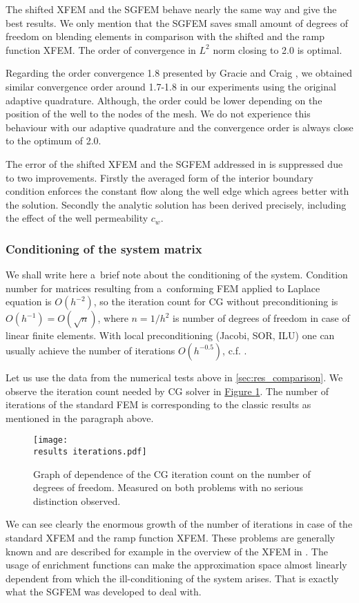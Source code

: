 \documentclass[dvipsnames,FM,Dis]{tulthesis}
\newcommand{\fig}[1]{\hyperref[#1]{Figure \ref{#1}}}
\newcommand{\results}{results/}
\begin{document}
The shifted XFEM and the SGFEM behave nearly the same way and give the best results. We only mention that the SGFEM saves 
small amount of degrees of freedom on blending elements in comparison with the shifted and the ramp function XFEM.
The order of convergence in $L^2$ norm closing to 2.0 is optimal.

Regarding the order convergence 1.8 presented by Gracie and Craig \cite{gracie_modelling_2010}, we obtained similar convergence order 
around 1.7-1.8 in our experiments using the original adaptive quadrature. Although, the order could be lower 
depending on the position of the well to the nodes of the mesh. We do not experience this behaviour with our adaptive
quadrature and the convergence order is always close to the optimum of 2.0.

The error of the shifted XFEM and the SGFEM addressed in \cite{exner_2016} is suppressed due to two improvements. 
Firstly the averaged form of the interior boundary condition enforces the constant flow along the well edge
which agrees better with the solution.
Secondly the analytic solution has been derived precisely, including the effect of the well permeability $c_w$.



\subsubsection{Conditioning of the system matrix} \label{sec:res_conditioning}
We shall write here a~brief note about the conditioning of the system.
Condition number for matrices resulting from a~conforming FEM applied to Laplace equation is $O(h^{-2})$, so the iteration count 
for CG without preconditioning is $O(h^{-1})=O(\sqrt{n})$, where $n=1/h^2$ is number of degrees of freedom in case of linear finite elements. 
With local preconditioning (Jacobi, 
SOR, ILU) one can usually achieve the number of iterations $O(h^{-0.5})$, c.f. \cite{ern_evaluation_2006}.

Let us use the data from the numerical tests above in \ref{sec:res_comparison}.
We observe the iteration count needed by CG solver in \fig{fig:iterations}.
The number of iterations of the standard FEM is corresponding to the classic results as mentioned in the paragraph above. 

\begin{figure}[!htb]
  \centering    
  \texttt{[image: \\results iterations.pdf]}
  \caption[Iterations graph]{Graph of dependence of the CG iteration count on the 
  number of degrees of freedom. Measured on both problems with no serious distinction observed.}
  \label{fig:iterations}
\end{figure}
%
We can see clearly the enormous growth of the number of iterations in case of the standard XFEM and the ramp 
function XFEM. These problems are generally known and are described for example in the overview of the XFEM in
\cite{fries_xfem_overview_2010}. The usage of enrichment functions can make the approximation space almost linearly 
dependent from which the ill-conditioning of the system arises. That is exactly what the SGFEM was developed to deal with.
\end{document}
